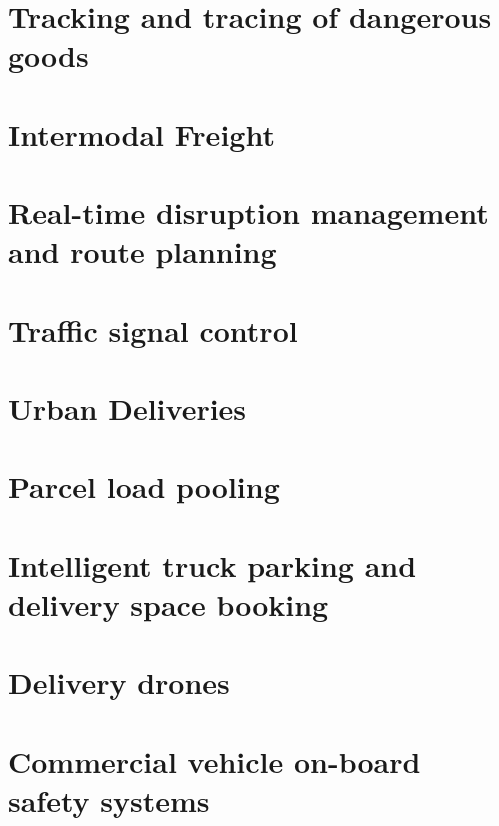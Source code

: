 \documentclass[
]{book}
\begin{document}
\hypertarget{tracking-and-tracing-of-dangerous-goods}{%
\section{Tracking and tracing of dangerous goods}\label{tracking-and-tracing-of-dangerous-goods}}

\hypertarget{intermodal-freight}{%
\section{Intermodal Freight}\label{intermodal-freight}}

\hypertarget{real-time-disruption-management-and-route-planning}{%
\section{Real-time disruption management and route planning}\label{real-time-disruption-management-and-route-planning}}

\hypertarget{traffic-signal-control}{%
\section{Traffic signal control}\label{traffic-signal-control}}

\hypertarget{urban-deliveries}{%
\section{Urban Deliveries}\label{urban-deliveries}}

\hypertarget{parcel-load-pooling}{%
\section{Parcel load pooling}\label{parcel-load-pooling}}

\hypertarget{intelligent-truck-parking-and-delivery-space-booking}{%
\section{Intelligent truck parking and delivery space booking}\label{intelligent-truck-parking-and-delivery-space-booking}}

\hypertarget{delivery-drones}{%
\section{Delivery drones}\label{delivery-drones}}

\hypertarget{commercial-vehicle-on-board-safety-systems}{%
\section{Commercial vehicle on-board safety systems}\label{commercial-vehicle-on-board-safety-systems}}
\end{document}
